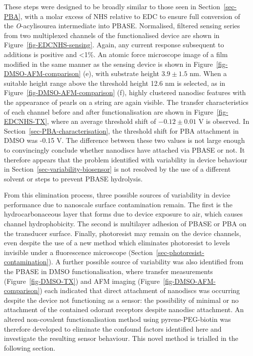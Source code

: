 \documentclass[
  a4paper,
]{scrbook}
\begin{document}
These steps were designed to be broadly similar to those seen in
Section~\ref{sec-PBA}, with a molar excess of NHS relative to EDC to
ensure full conversion of the \emph{O}-acylisourea intermediate into
PBASE. Normalised, filtered sensing series from two multiplexed channels
of the functionalised device are shown in
Figure~\ref{fig-EDCNHS-sensing}. Again, any current response subsequent
to additions is positive and \textless1\%. An atomic force microscope
image of a film modified in the same manner as the sensing device is
shown in Figure~\ref{fig-DMSO-AFM-comparison} (e), with substrate height
\(3.9\pm1.5\) nm. When a suitable height range above the threshold
height 12.6 nm is selected, as in Figure~\ref{fig-DMSO-AFM-comparison}
(f), highly clustered nanodisc features with the appearance of pearls on
a string are again visible. The transfer characteristics of each channel
before and after functionalisation are shown in
Figure~\ref{fig-EDCNHS-TX}, where an average threshold shift of
\(-0.12\pm0.01\) V is observed. In
Section~\ref{sec-PBA-characterisation}, the threshold shift for PBA
attachment in DMSO was -0.15 V. The difference between these two values
is not large enough to convincingly conclude whether nanodiscs have
attached via PBASE or not. It therefore appears that the problem
identified with variability in device behaviour in
Section~\ref{sec-variability-biosensor} is not resolved by the use of a
different solvent or steps to prevent PBASE hydrolysis.

From this elimination process, three possible sources of variability in
device performance due to nanoscale surface contamination remain. The
first is the hydrocarbonaceous layer that forms due to device exposure
to air, which causes channel hydrophobicity. The second is multilayer
adhesion of PBASE or PBA on the transducer surface. Finally, photoresist
may remain on the device channels, even despite the use of a new method
which eliminates photoresist to levels invisible under a fluorescence
microscope (Section~\ref{sec-photoresist-contamination}). A further
possible source of variability was also identified from the PBASE in
DMSO functionalisation, where transfer measurements
(Figure~\ref{fig-DMSO-TX}) and AFM imaging
(Figure~\ref{fig-DMSO-AFM-comparison}) each indicated that direct
attachment of nanodiscs was occurring despite the device not functioning
as a sensor: the possibility of minimal or no attachment of the
contained odorant receptors despite nanodisc attachment. An altered
non-covalent functionalisation method using pyrene-PEG-biotin was
therefore developed to eliminate the confound factors identified here
and investigate the resulting sensor behaviour. This novel method is
trialled in the following section.
\end{document}
